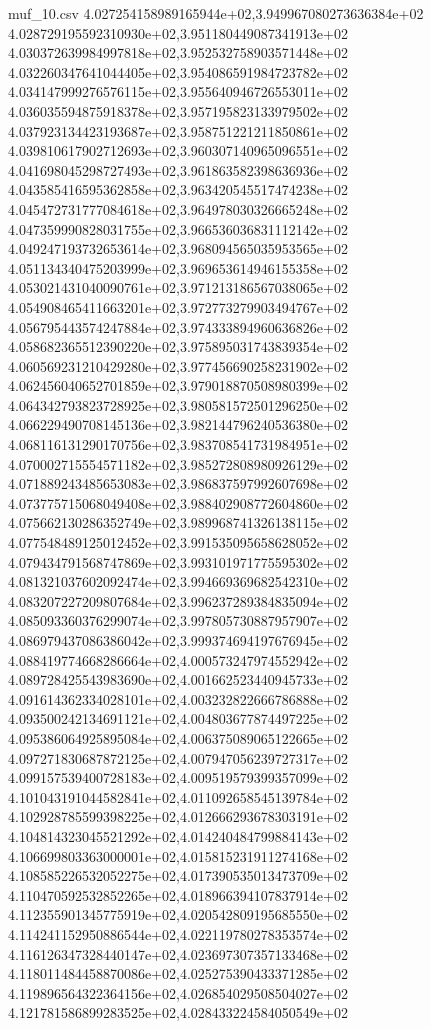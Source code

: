 \begin{filecontents*}{muf_10.csv}
4.027254158989165944e+02,3.949967080273636384e+02
4.028729195592310930e+02,3.951180449087341913e+02
4.030372639984997818e+02,3.952532758903571448e+02
4.032260347641044405e+02,3.954086591984723782e+02
4.034147999276576115e+02,3.955640946726553011e+02
4.036035594875918378e+02,3.957195823133979502e+02
4.037923134423193687e+02,3.958751221211850861e+02
4.039810617902712693e+02,3.960307140965096551e+02
4.041698045298727493e+02,3.961863582398636936e+02
4.043585416595362858e+02,3.963420545517474238e+02
4.045472731777084618e+02,3.964978030326665248e+02
4.047359990828031755e+02,3.966536036831112142e+02
4.049247193732653614e+02,3.968094565035953565e+02
4.051134340475203999e+02,3.969653614946155358e+02
4.053021431040090761e+02,3.971213186567038065e+02
4.054908465411663201e+02,3.972773279903494767e+02
4.056795443574247884e+02,3.974333894960636826e+02
4.058682365512390220e+02,3.975895031743839354e+02
4.060569231210429280e+02,3.977456690258231902e+02
4.062456040652701859e+02,3.979018870508980399e+02
4.064342793823728925e+02,3.980581572501296250e+02
4.066229490708145136e+02,3.982144796240536380e+02
4.068116131290170756e+02,3.983708541731984951e+02
4.070002715554571182e+02,3.985272808980926129e+02
4.071889243485653083e+02,3.986837597992607698e+02
4.073775715068049408e+02,3.988402908772604860e+02
4.075662130286352749e+02,3.989968741326138115e+02
4.077548489125012452e+02,3.991535095658628052e+02
4.079434791568747869e+02,3.993101971775595302e+02
4.081321037602092474e+02,3.994669369682542310e+02
4.083207227209807684e+02,3.996237289384835094e+02
4.085093360376299074e+02,3.997805730887957907e+02
4.086979437086386042e+02,3.999374694197676945e+02
4.088419774668286664e+02,4.000573247974552942e+02
4.089728425543983690e+02,4.001662523440945733e+02
4.091614362334028101e+02,4.003232822666786888e+02
4.093500242134691121e+02,4.004803677874497225e+02
4.095386064925895084e+02,4.006375089065122665e+02
4.097271830687872125e+02,4.007947056239727317e+02
4.099157539400728183e+02,4.009519579399357099e+02
4.101043191044582841e+02,4.011092658545139784e+02
4.102928785599398225e+02,4.012666293678303191e+02
4.104814323045521292e+02,4.014240484799884143e+02
4.106699803363000001e+02,4.015815231911274168e+02
4.108585226532052275e+02,4.017390535013473709e+02
4.110470592532852265e+02,4.018966394107837914e+02
4.112355901345775919e+02,4.020542809195685550e+02
4.114241152950886544e+02,4.022119780278353574e+02
4.116126347328440147e+02,4.023697307357133468e+02
4.118011484458870086e+02,4.025275390433371285e+02
4.119896564322364156e+02,4.026854029508504027e+02
4.121781586899283525e+02,4.028433224584050549e+02

\end{filecontents*}
